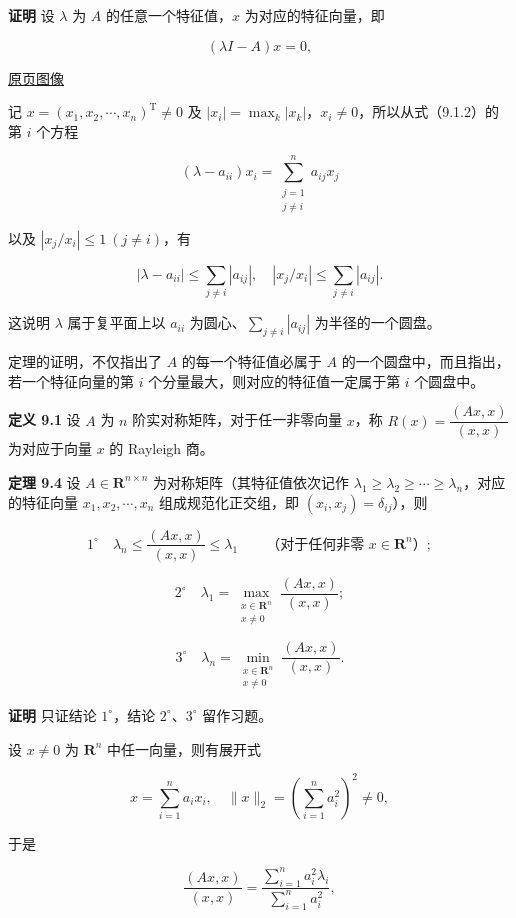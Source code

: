 \documentclass[
  10pt,
  fontset=fandol]{ctexart}
\begin{document}
\textbf{证明} 设 \(\lambda\) 为 \(A\) 的任意一个特征值，\(x\) 为对应的特征向量，即

\[
(\lambda I-A)x=0,
\]

\href{../../source-images/pdf-234.jpeg}{原页图像}

记 \(x=(x_1,x_2,\cdots,x_n)^{\mathrm T}\ne0\) 及 \(|x_i|=\max_k|x_k|\)，\(x_i\ne0\)，所以从式（9.1.2）的第 \(i\) 个方程

\[
(\lambda-a_{ii})x_i=\sum_{\substack{j=1\\j\ne i}}^na_{ij}x_j
\]

以及 \(|x_j/x_i|\leq1\ (j\ne i)\)，有

\[
|\lambda-a_{ii}|\leq\sum_{j\ne i}|a_{ij}|,\quad |x_j/x_i|\leq\sum_{j\ne i}|a_{ij}|.
\]

这说明 \(\lambda\) 属于复平面上以 \(a_{ii}\) 为圆心、\(\sum_{j\ne i}|a_{ij}|\) 为半径的一个圆盘。

定理的证明，不仅指出了 \(A\) 的每一个特征值必属于 \(A\) 的一个圆盘中，而且指出，若一个特征向量的第 \(i\) 个分量最大，则对应的特征值一定属于第 \(i\) 个圆盘中。

\textbf{定义 9.1} 设 \(A\) 为 \(n\) 阶实对称矩阵，对于任一非零向量 \(x\)，称 \(R(x)=\dfrac{(Ax,x)}{(x,x)}\) 为对应于向量 \(x\) 的 Rayleigh 商。

\textbf{定理 9.4} 设 \(A\in\mathbf R^{n\times n}\) 为对称矩阵（其特征值依次记作 \(\lambda_1\geq\lambda_2\geq\cdots\geq\lambda_n\)，对应的特征向量 \(x_1,x_2,\cdots,x_n\) 组成规范化正交组，即 \((x_i,x_j)=\delta_{ij}\)），则

\[
1^\circ\quad \lambda_n\leq\frac{(Ax,x)}{(x,x)}\leq\lambda_1\qquad\text{（对于任何非零 }x\in\mathbf R^n\text{）};
\]

\[
2^\circ\quad \lambda_1=\max_{\substack{x\in\mathbf R^n\\x\ne0}}\frac{(Ax,x)}{(x,x)};
\]

\[
3^\circ\quad \lambda_n=\min_{\substack{x\in\mathbf R^n\\x\ne0}}\frac{(Ax,x)}{(x,x)}.
\]

\textbf{证明} 只证结论 \(1^\circ\)，结论 \(2^\circ\)、\(3^\circ\) 留作习题。

设 \(x\ne0\) 为 \(\mathbf R^n\) 中任一向量，则有展开式

\[
x=\sum_{i=1}^na_ix_i,\quad \|x\|_2=\left(\sum_{i=1}^na_i^2\right)^2\ne0,
\]

于是

\[
\frac{(Ax,x)}{(x,x)}=\frac{\displaystyle\sum_{i=1}^na_i^2\lambda_i}{\displaystyle\sum_{i=1}^na_i^2},
\]
\end{document}
